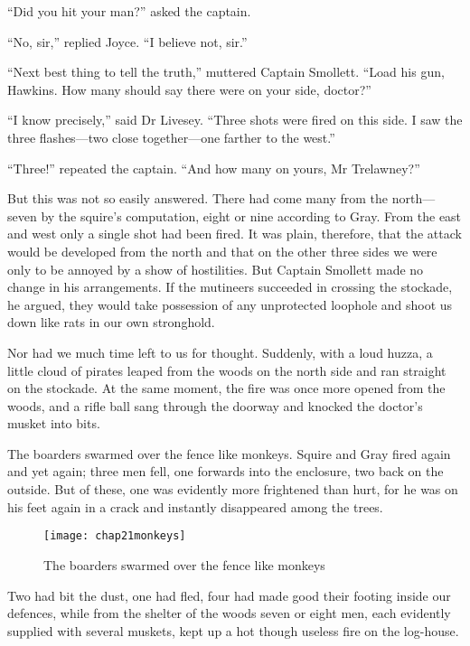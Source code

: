 \enquote{Did you hit your man?} asked the captain.

\enquote{No, sir,} replied Joyce. \enquote{I believe not, sir.}

\enquote{Next best thing to tell the truth,} muttered Captain Smollett. \enquote{Load his gun, Hawkins. How many should say there were on your side, doctor?}

\enquote{I know precisely,} said Dr Livesey. \enquote{Three shots were fired on this side. I saw the three flashes---two close together---one farther to the west.}

\enquote{Three!} repeated the captain. \enquote{And how many on yours, Mr Trelawney?}

But this was not so easily answered. There had come many from the north---seven by the squire’s computation, eight or nine according to Gray. From the east and west only a single shot had been fired. It was plain, therefore, that the attack would be developed from the north and that on the other three sides we were only to be annoyed by a show of hostilities. But Captain Smollett made no change in his arrangements. If the mutineers succeeded in crossing the stockade, he argued, they would take possession of any unprotected loophole and shoot us down like rats in our own stronghold.

Nor had we much time left to us for thought. Suddenly, with a loud huzza, a little cloud of pirates leaped from the woods on the north side and ran straight on the stockade. At the same moment, the fire was once more opened from the woods, and a rifle ball sang through the doorway and knocked the doctor’s musket into bits.

The boarders swarmed over the fence like monkeys. Squire and Gray fired again and yet again; three men fell, one forwards into the enclosure, two back on the outside. But of these, one was evidently more frightened than hurt, for he was on his feet again in a crack and instantly disappeared among the trees.

  \begin{sidewaysfigure}
\texttt{[image: chap21monkeys]}%
\caption{The boarders swarmed over the fence like monkeys}
\end{sidewaysfigure} 

Two had bit the dust, one had fled, four had made good their footing inside our defences, while from the shelter of the woods seven or eight men, each evidently supplied with several muskets, kept up a hot though useless fire on the log-house.

